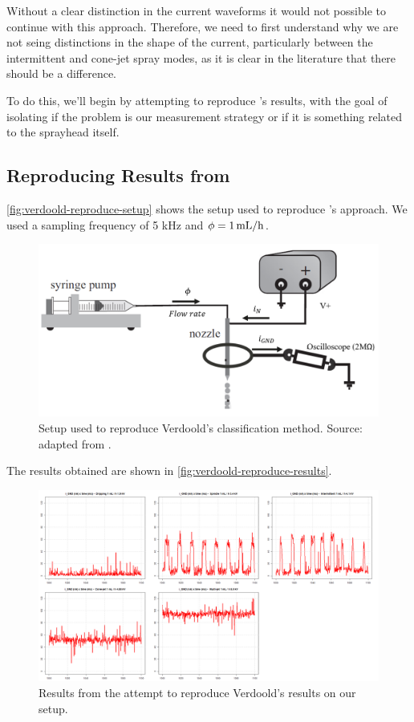 \documentclass[oneside,12pt]{article}
\begin{document}
Without a clear distinction in the current waveforms it would not possible to continue with this approach.
Therefore, we need to first understand why we are not seing distinctions in the shape 
of the current, particularly between the intermittent and cone-jet spray modes, as it is clear in the 
literature that there should be a difference.

To do this, we'll begin by attempting to reproduce \cite{Verdoold2013}'s results, with the goal of isolating 
if the problem is our measurement strategy or if it is something related to the sprayhead itself.

\subsection{Reproducing Results from \cite{Verdoold2013}}

\autoref{fig:verdoold-reproduce-setup} shows the setup used to reproduce \cite{Verdoold2013}'s approach.
We used a sampling frequency of 5 kHz and $\phi = 1 \,\mathrm{mL/h}$. 

\begin{figure}[h!]
    \centering
    \includegraphics[width=.8\textwidth,trim=1 1 1 1,clip]{figures/verdoold-reproduce-setup.png}
    \caption{Setup used to reproduce Verdoold's classification method. Source: adapted from \cite{Verdoold2013}.}
    \label{fig:verdoold-reproduce-setup}
\end{figure}

The results obtained are shown in \autoref{fig:verdoold-reproduce-results}. 

\begin{figure}[h!]
    \centering
    \includegraphics[width=1\textwidth,trim=1 1 1 1,clip]{figures/verdoold-reproduce-results.png}
    \caption{Results from the attempt to reproduce Verdoold's results on our setup.}
    \label{fig:verdoold-reproduce-results}
\end{figure}
\end{document}
